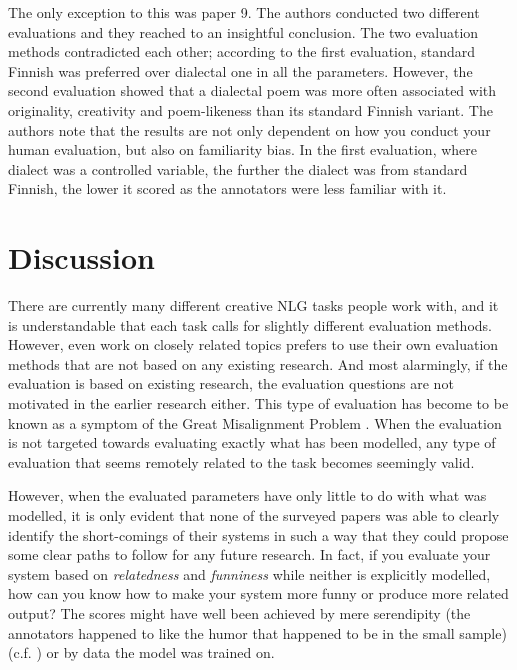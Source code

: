 \documentclass[11pt,a4paper]{article}
\begin{document}
The only exception to this was paper 9. The authors conducted two different evaluations and they reached to an insightful conclusion. The two evaluation methods contradicted each other; according to the first evaluation, standard Finnish was preferred over dialectal one in all the parameters. However, the second evaluation showed that a dialectal poem was more often associated with originality, creativity and poem-likeness than its standard Finnish variant. The authors note that the results are not only dependent on how you conduct your human evaluation, but also on familiarity bias. In the first evaluation, where dialect was a controlled variable, the further the dialect was from standard Finnish, the lower it scored as the annotators were less familiar with it.

\section{Discussion}

There are currently many different creative NLG tasks people work with, and it is understandable that each task calls for slightly different evaluation methods. However, even work on closely related topics prefers to use their own evaluation methods that are not based on any existing research. And most alarmingly, if the evaluation is based on existing research, the evaluation questions are not motivated in the earlier research either. This type of evaluation has become to be known as a symptom of the Great Misalignment Problem \cite{hamalainen-alnajjar-2021-great}. When the evaluation is not targeted towards evaluating exactly what has been modelled, any type of evaluation that seems remotely related to the task becomes seemingly valid. 

However, when the evaluated parameters have only little to do with what was modelled, it is only evident that none of the surveyed papers was able to clearly identify the short-comings of their systems in such a way that they could propose some clear paths to follow for any future research. In fact, if you evaluate your system based on \textit{relatedness} and \textit{funniness} while neither is explicitly modelled, how can you know how to make your system more funny or produce more related output? The scores might have well been achieved by mere serendipity (the annotators happened to like the humor that happened to be in the small sample) (c.f. \citealt{gervas-2017-template}) or by data the model was trained on. 
\end{document}
